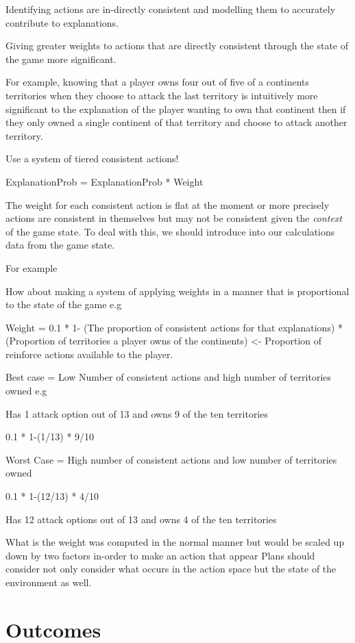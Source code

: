 \documentclass[parskip]{cs4rep}
\begin{document}
Identifying actions are in-directly consistent and modelling them to accurately contribute to explanations.
 
Giving greater weights to actions that are directly consistent through the state of the game  more significant.

For example, knowing that a player owns four out of five of a continents territories when they choose to attack the last territory is intuitively more significant to the explanation of the player wanting to own that continent then if they only owned a single continent of that territory and choose to attack another territory.

Use a system of tiered consistent actions!

ExplanationProb = ExplanationProb * Weight

The weight for each consistent action is flat at the moment or more precisely actions are consistent in themselves but may not be consistent given the \textit{context} of the game state. To deal with this, we should introduce into our calculations data from the game state.

For example

How about making a system of applying weights in a manner that is proportional to the state of the game e.g

Weight = 0.1 * 1- (The proportion of consistent actions for that explanations) * (Proportion of territories a player owns of the continents) <- Proportion of reinforce actions available to the player.

Best case = Low Number of consistent actions and high number of territories owned e.g

Has 1 attack option out of 13 and owns 9 of the ten territories

0.1 * 1-(1/13) * 9/10 

Worst Case = High number of consistent actions and low number of territories owned

0.1 * 1-(12/13) * 4/10 

Has 12 attack options out of 13 and owns 4 of the ten territories

What is the weight was computed in the normal manner but would be scaled up down by two factors in-order to make an action that appear
Plans should consider not only consider what occurs in the action space but the state of the environment as well.

\section{Outcomes}
\end{document}
